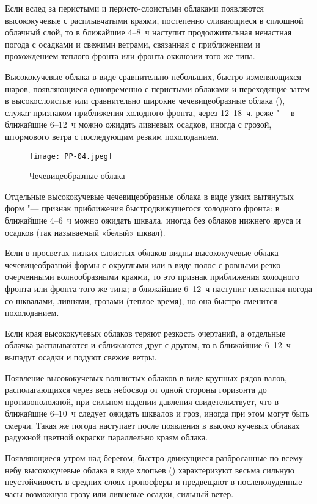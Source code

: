  Если вслед за перистыми и перисто-слоистыми облаками появляются
высококучевые с расплывчатыми краями, постепенно сливающиеся в
сплошной облачный слой, то в ближайшие 4--8~ч наступит
продолжительная ненастная погода с осадками и свежими ветрами,
связанная с приближением и прохождением теплого фронта или фронта
окклюзии того же типа.

 Высококучевые облака в виде сравнительно небольших, быстро
изменяющихся шаров, появляющиеся одновременно с перистыми облаками и
переходящие затем в высокослоистые или сравнительно широкие
чечевицеобразные облака (), служат признаком приближения
холодного фронта, через 12--18~ч. реже "--- в ближайшие 6--12~ч
можно ожидать ливневых осадков, иногда с грозой, штормового ветра с
последующим резким похолоданием.

\begin{figure}[htb]
  \centering{}
  \texttt{[image: PP-04.jpeg]}
  \caption{Чечевицеобразные облака}
  \label{fig:pp04}
  \small
  \centering{}
\end{figure}

 Отдельные высококучевые чечевицеобразные облака в виде узких
вытянутых форм "--- признак приближения быстродвижущегося холодного
фронта: в ближайшие 4--6~ч можно ожидать шквала, иногда без
облаков нижнего яруса и осадков (так называемый «белый» шквал).

 Если в просветах низких слоистых облаков видны высококучевые
облака чечевицеобразной формы с округлыми или в виде полос с ровными
резко очерченными волнообразными краями, то это признак приближения
холодного фронта или фронта того же типа; в ближайшие 6--12~ч наступит
ненастная погода со шквалами, ливнями, грозами (теплое время), но она
быстро сменится похолоданием.

 Если края высококучевых облаков теряют резкость очертаний, а
отдельные облачка расплываются и сближаются друг с другом, то в
ближайшие 6--12~ч выпадут осадки и подуют свежие ветры.

 Появление высококучевых волнистых облаков в виде крупных рядов
валов, располагающихся через весь небосвод от одной стороны горизонта
до противоположной, при сильном падении давления свидетельствует, что
в ближайшие 6--10~ч следует ожидать шквалов и гроз, иногда при этом
могут быть смерчи. Такая же погода наступает после появления в высоко
кучевых облаках радужной цветной окраски параллельно краям облака.

 Появляющиеся утром над берегом, быстро движущиеся разбросанные по
всему небу высококучевые облака в виде хлопьев () характеризуют
весьма сильную неустойчивость в средних слоях тропосферы и предвещают
в послеполуденные часы возможную грозу или ливневые осадки, сильный
ветер.

